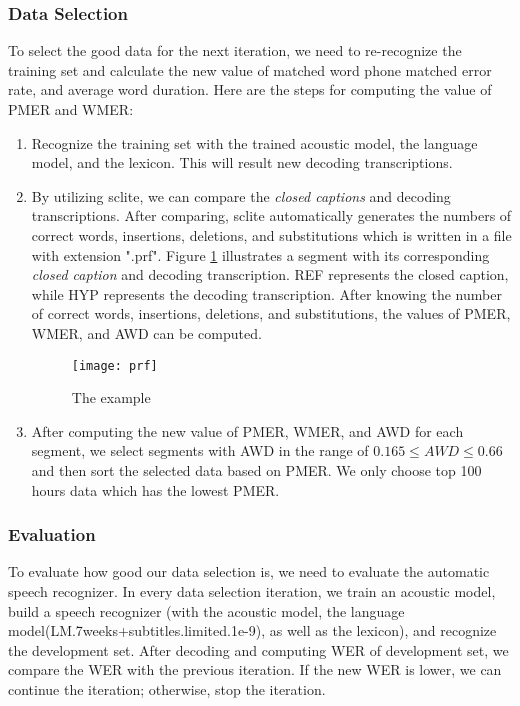 \subsubsection{Data Selection}
To select the good data for the next iteration, we need to re-recognize the training set and calculate the new value of matched word phone matched error rate, and average word duration. Here are the steps for computing the value of PMER and WMER:
\begin{enumerate}
\item Recognize the training set with the trained acoustic model, the language model, and the lexicon. This will result new decoding transcriptions.
\item By utilizing sclite, we can compare the \textit{closed captions} and decoding transcriptions. After comparing, sclite automatically generates the numbers of correct words, insertions, deletions, and substitutions which is written in a file with extension ".prf". Figure \ref{prf} illustrates a segment with its corresponding \textit{closed caption} and decoding transcription.  REF represents the closed caption, while HYP represents the decoding transcription. After knowing the number of correct words, insertions, deletions, and substitutions, the values of PMER, WMER, and AWD can be computed.

\begin{figure}[H]
\caption{The example}
\label{prf}
\texttt{[image: prf]} 
\centering
\end{figure}

\item After computing the new value of PMER, WMER, and AWD for each segment, we select segments with AWD in the range of $0.165 \leq AWD \leq 0.66$ and then sort the selected data based on PMER. We only choose top 100 hours data which has the lowest PMER.

\end{enumerate} 



\subsubsection{Evaluation}
To evaluate how good our data selection is, we need to evaluate the automatic speech recognizer. In every data selection iteration, we train an acoustic model, build a speech recognizer (with the acoustic model, the language model(LM.7weeks+subtitles.limited.1e-9), as well as the lexicon),  and recognize the development set. After decoding and computing WER of development set, we compare the WER with the previous iteration. If the new WER is lower, we can continue the iteration; otherwise, stop the iteration. 


